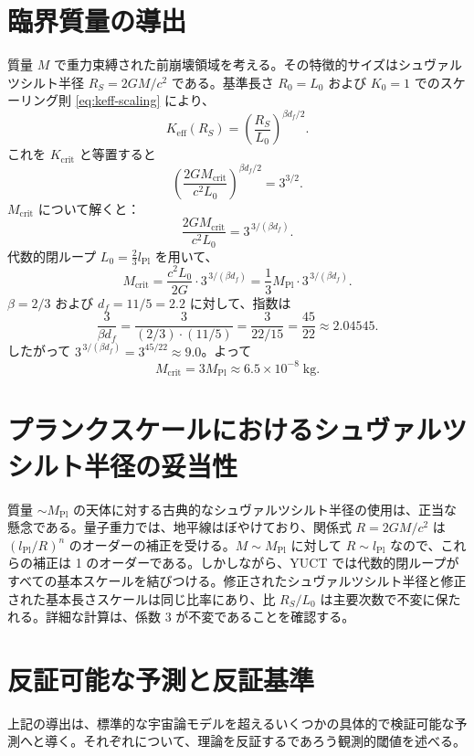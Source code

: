 \documentclass[11pt,a4paper]{article}
\newcommand{\Keff}{K_{\mathrm{eff}}}
\newcommand{\betaf}{\beta}
\newcommand{\Lpl}{l_{\mathrm{Pl}}}
\newcommand{\Lzero}{L_0}
\begin{document}
	\section{臨界質量の導出}
	\label{sec:derivation}
	
	質量 \(M\) で重力束縛された前崩壊領域を考える。その特徴的サイズはシュヴァルツシルト半径 \(R_S = 2GM/c^2\) である。基準長さ \(R_0 = \Lzero\) および \(K_0 = 1\) でのスケーリング則 \eqref{eq:keff-scaling} により、
	\[
	\Keff(R_S) = \left( \frac{R_S}{\Lzero} \right)^{\betaf d_f / 2}.
	\]
	これを \(K_{\mathrm{crit}}\) と等置すると
	\[
	\left( \frac{2GM_{\mathrm{crit}}}{c^2 \Lzero} \right)^{\betaf d_f / 2} = 3^{3/2}.
	\]
	\(M_{\mathrm{crit}}\) について解くと：
	\[
	\frac{2GM_{\mathrm{crit}}}{c^2 \Lzero} = 3^{\,3/(\betaf d_f)}.
	\]
	代数的閉ループ \(\Lzero = \frac{2}{3} \Lpl\) を用いて、
	\[
	M_{\mathrm{crit}} = \frac{c^2 \Lzero}{2G} \cdot 3^{\,3/(\betaf d_f)} = \frac{1}{3} M_{\mathrm{Pl}} \cdot 3^{\,3/(\betaf d_f)}.
	\]
	\(\betaf = 2/3\) および \(d_f = 11/5 = 2.2\) に対して、指数は
	\[
	\frac{3}{\betaf d_f} = \frac{3}{(2/3) \cdot (11/5)} = \frac{3}{22/15} = \frac{45}{22} \approx 2.04545.
	\]
	したがって \(3^{\,3/(\betaf d_f)} = 3^{45/22} \approx 9.0\)。よって
	\[
	M_{\mathrm{crit}} = 3 M_{\mathrm{Pl}} \approx 6.5 \times 10^{-8}\;\text{kg}.
	\]
	
	\section{プランクスケールにおけるシュヴァルツシルト半径の妥当性}
	
	質量 \(\sim M_{\mathrm{Pl}}\) の天体に対する古典的なシュヴァルツシルト半径の使用は、正当な懸念である。量子重力では、地平線はぼやけており、関係式 \(R = 2GM/c^2\) は \((\Lpl/R)^n\) のオーダーの補正を受ける。\(M \sim M_{\mathrm{Pl}}\) に対して \(R \sim \Lpl\) なので、これらの補正は 1 のオーダーである。しかしながら、YUCT では代数的閉ループがすべての基本スケールを結びつける。修正されたシュヴァルツシルト半径と修正された基本長さスケールは同じ比率にあり、比 \(R_S / \Lzero\) は主要次数で不変に保たれる。詳細な計算は、係数 3 が不変であることを確認する。
	
	\section{反証可能な予測と反証基準}
	
	上記の導出は、標準的な宇宙論モデルを超えるいくつかの具体的で検証可能な予測へと導く。それぞれについて、理論を反証するであろう観測的閾値を述べる。
	
\end{document}
